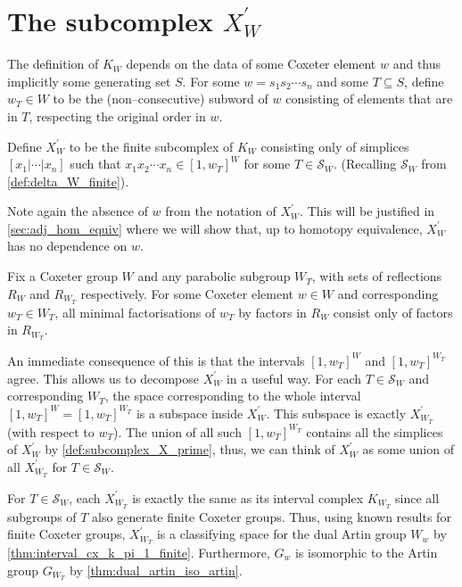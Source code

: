 \documentclass[class=article, crop=false]{standalone}
\begin{document}
\section{The subcomplex \texorpdfstring{$X_{W}^\prime$}{X W Prime}}
The definition of $K_{W}$ depends on the data of some Coxeter element $w$ and thus implicitly some generating set $S$. For some $w = s_1s_2\cdots s_n$ and some $T\subseteq S$, define $w_T\in W$ to be the (non--consecutive) subword of $w$ consisting of elements that are in $T$, respecting the original order in $w$. 
\begin{definition}
    Define $X_{W}^\prime$ to be the finite subcomplex of $K_{W}$ consisting only of simplices $[x_1 | \cdots | x_n]$ such that $x_1x_2\cdots x_n \in [1,w_T]^W$ for some $T \in \mathcal{S}_W$. (Recalling $\mathcal{S}_W$ from \cref{def:delta_W_finite}).
    \label{def:subcomplex_X_prime}
\end{definition}
Note again the absence of $w$ from the notation of $X^\prime_W$. This will be justified in \cref{sec:adj_hom_equiv} where we will show that, up to homotopy equivalence, $X_W^\prime$ has no dependence on $w$.

\begin{lemma}[{\hspace{1sp}\cite[Lemma 5.2]{paolini_salvetti_kpi1_2021}}]
    Fix a Coxeter group $W$ and any parabolic subgroup $W_T$, with sets of reflections $R_W$ and $R_{W_T}$ respectively. For some Coxeter element $w \in W$ and corresponding $w_T \in W_T$, all minimal factorisations of $w_T$ by factors in $R_W$ consist only of factors in $R_{W_T}$.
    \label{lem:all_decompositions_of_w_T_are_R}
\end{lemma}
An immediate consequence of this is that the intervals $[1,w_T]^W$ and $[1,w_T]^{W_T}$ agree. This allows us to decompose $X^\prime_W$ in a useful way. For each $T \in \mathcal{S}_W$ and corresponding $W_T$, the space corresponding to the whole interval $[1, w_T]^W=[1,w_T]^{W_T}$ is a subspace inside $X^\prime_W$. This subspace is exactly $X^\prime_{W_T}$ (with respect to $w_T$). The union of all such $[1,w_T]^{W_T}$ contains all the simplices of $X_W^\prime$ by \cref{def:subcomplex_X_prime}, thus, we can think of $X^\prime_W$ as some union of all $X^\prime_{W_T}$ for $T \in \mathcal{S}_W$.

For $T \in \mathcal{S}_W$, each $X^\prime_{W_T}$ is exactly the same as its interval complex $K_{{W_T}}$ since all subgroups of $T$ also generate finite Coxeter groups. Thus, using known results for finite Coxeter groups, $X^\prime_{W_T}$ is a classifying space for the dual Artin group $W_w$ by \cref{thm:interval_cx_k_pi_1_finite}. Furthermore, $G_w$ is isomorphic to the Artin group $G_{W_T}$ by \cref{thm:dual_artin_iso_artin}.
\end{document}
